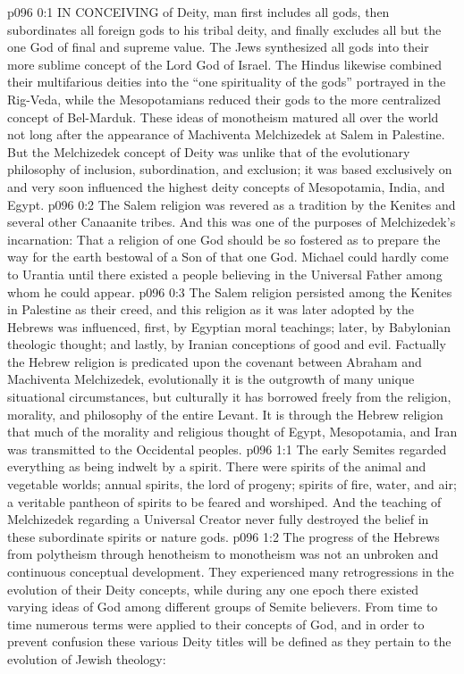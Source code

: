 \vs p096 0:1 IN CONCEIVING of Deity, man first includes all gods, then subordinates all foreign gods to his tribal deity, and finally excludes all but the one God of final and supreme value. The Jews synthesized all gods into their more sublime concept of the Lord God of Israel. The Hindus likewise combined their multifarious deities into the “one spirituality of the gods” portrayed in the Rig\hyp{}Veda, while the Mesopotamians reduced their gods to the more centralized concept of Bel\hyp{}Marduk. These ideas of monotheism matured all over the world not long after the appearance of Machiventa Melchizedek at Salem in Palestine. But the Melchizedek concept of Deity was unlike that of the evolutionary philosophy of inclusion, subordination, and exclusion; it was based exclusively on  and very soon influenced the highest deity concepts of Mesopotamia, India, and Egypt.
\vs p096 0:2 \pc The Salem religion was revered as a tradition by the Kenites and several other Canaanite tribes. And this was one of the purposes of Melchizedek’s incarnation: That a religion of one God should be so fostered as to prepare the way for the earth bestowal of a Son of that one God. Michael could hardly come to Urantia until there existed a people believing in the Universal Father among whom he could appear.
\vs p096 0:3 The Salem religion persisted among the Kenites in Palestine as their creed, and this religion as it was later adopted by the Hebrews was influenced, first, by Egyptian moral teachings; later, by Babylonian theologic thought; and lastly, by Iranian conceptions of good and evil. Factually the Hebrew religion is predicated upon the covenant between Abraham and Machiventa Melchizedek, evolutionally it is the outgrowth of many unique situational circumstances, but culturally it has borrowed freely from the religion, morality, and philosophy of the entire Levant. It is through the Hebrew religion that much of the morality and religious thought of Egypt, Mesopotamia, and Iran was transmitted to the Occidental peoples.
\vs p096 1:1 The early Semites regarded everything as being indwelt by a spirit. There were spirits of the animal and vegetable worlds; annual spirits, the lord of progeny; spirits of fire, water, and air; a veritable pantheon of spirits to be feared and worshiped. And the teaching of Melchizedek regarding a Universal Creator never fully destroyed the belief in these subordinate spirits or nature gods.
\vs p096 1:2 The progress of the Hebrews from polytheism through henotheism to monotheism was not an unbroken and continuous conceptual development. They experienced many retrogressions in the evolution of their Deity concepts, while during any one epoch there existed varying ideas of God among different groups of Semite believers. From time to time numerous terms were applied to their concepts of God, and in order to prevent confusion these various Deity titles will be defined as they pertain to the evolution of Jewish theology:
